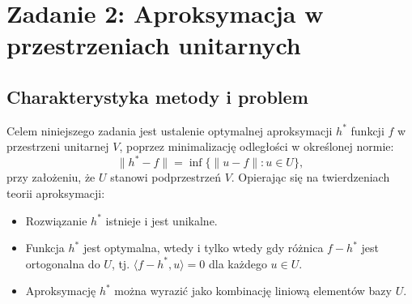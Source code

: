 \section{Zadanie 2: Aproksymacja w przestrzeniach unitarnych}
\subsection{Charakterystyka metody i problem}
Celem niniejszego zadania jest ustalenie optymalnej aproksymacji \( h^* \) funkcji \( f \) w przestrzeni unitarnej \( V \), poprzez minimalizację odległości w określonej normie: \[
\|h^* - f\| = \inf \{\|u - f\| : u \in U\},
\] przy założeniu, że \( U \) stanowi podprzestrzeń \( V \). Opierając się na twierdzeniach teorii aproksymacji: 
\begin{itemize}
    \item Rozwiązanie \( h^* \) istnieje i jest unikalne.
    \item Funkcja \( h^* \) jest optymalna, wtedy i tylko wtedy gdy różnica \( f - h^* \) jest ortogonalna do \( U \), tj. \( \langle f - h^*, u \rangle = 0 \) dla każdego \( u \in U \).
    \item Aproksymację \( h^* \) można wyrazić jako kombinację liniową elementów bazy \( U \).
\end{itemize}
